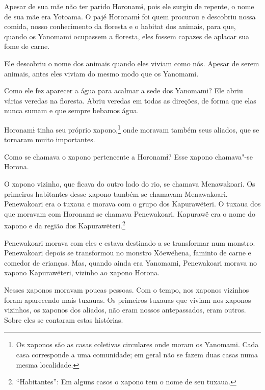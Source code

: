 Apesar de sua mãe não ter parido Horonamɨ, pois ele surgiu de repente, o
nome de sua mãe era Yotoama. O pajé Horonamɨ foi quem procurou e
descobriu nossa comida, nosso conhecimento da floresta e o habitat dos
animais, para que, quando os Yanomami ocupassem a floresta, eles fossem
capazes de aplacar sua fome de carne. 

Ele descobriu o nome dos animais quando eles viviam como nós. Apesar de
serem animais, antes eles viviam do mesmo modo que os Yanomami. 

Como ele fez aparecer a água para acalmar a sede dos Yanomami? Ele abriu
várias veredas na floresta. Abriu veredas em todas as direções, de forma
que elas nunca sumam e que sempre bebamos água. 

Horonamɨ tinha seu próprio xapono,\footnote{  Os xaponos são as casas coletivas circulares onde moram os Yanomami. Cada
casa corresponde a uma comunidade; em geral não se fazem duas casas numa
mesma localidade.} onde moravam
também seus aliados, que se tornaram muito importantes. 

Como se chamava o xapono pertencente a Horonamɨ? Esse xapono chamava"-se
Horona. 

O xapono vizinho, que ficava do outro lado do rio, se chamava
Menawakoari. Os primeiros habitantes desse xapono\emph{ }também se
chamavam Menawakoari. Penewakoari era o tuxaua e morava com o grupo dos
Kapurawëteri. O tuxaua dos que moravam com Horonamɨ se chamava
Penewakoari. Kapurawë era o nome do xapono\emph{ }e da região dos
Kapurawëteri.\footnote{  ``Habitantes'': Em alguns casos o xapono tem o nome de seu tuxaua.}

Penewakoari morava com eles e estava destinado a se transformar num
monstro. Penewakoari depois se transformou no monstro Xõewëhena, faminto
de carne e comedor de crianças. Mas, quando ainda era Yanomami,
Penewakoari morava no xapono Kapurawëteri, vizinho ao
xapono\emph{ }Horona.

Nesses xaponos moravam poucas pessoas. Com o tempo, nos xaponos vizinhos
foram aparecendo mais tuxauas. Os primeiros tuxauas que viviam nos
xaponos\emph{ }vizinhos, os xaponos dos aliados, não eram nossos
antepassados, eram outros. Sobre eles se contaram estas histórias.